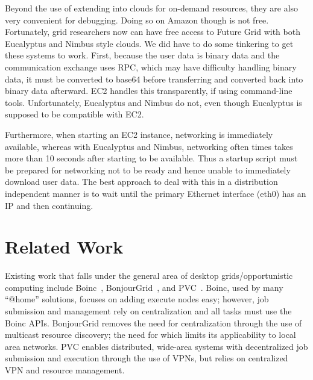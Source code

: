 \documentclass[conference]{IEEEtran}
\begin{document}
Beyond the use of extending into clouds for on-demand resources, they are also
very convenient for debugging.  Doing so on Amazon though is not free.
Fortunately, grid researchers now can have free access to Future Grid with both
Eucalyptus and Nimbus style clouds.  We did have to do some tinkering to get
these systems to work.  First, because the user data is binary data and the
communication exchange uses RPC, which may have difficulty handling binary
data, it must be converted to base64 before transferring and converted back
into binary data afterward.  EC2 handles this transparently, if using
command-line tools.  Unfortunately, Eucalyptus and Nimbus do not, even though
Eucalyptus is supposed to be compatible with EC2.

Furthermore, when starting an EC2 instance, networking is immediately
available, whereas with Eucalyptus and Nimbus, networking often times takes
more than 10 seconds after starting to be available. Thus a startup script must
be prepared for networking not to be ready and hence unable to immediately
download user data.  The best approach to deal with this in a distribution
independent manner is to wait until the primary Ethernet interface (eth0) has
an IP and then continuing.

\section{Related Work}
\label{related_work}

Existing work that falls under the general area of desktop grids/opportunistic
computing include Boinc~\cite{boinc}, BonjourGrid~\cite{bonjourgrid}, and
PVC~\cite{pvc}.  Boinc, used by many ``@home'' solutions, focuses on adding
execute nodes easy; however, job submission and management rely on
centralization and all tasks must use the Boinc APIs.  BonjourGrid removes the
need for centralization through the use of multicast resource discovery; the
need for which limits its applicability to local area networks.  PVC enables
distributed, wide-area systems with decentralized job submission and execution
through the use of VPNs, but relies on centralized VPN and resource management.
\end{document}

